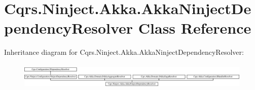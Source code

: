 \hypertarget{classCqrs_1_1Ninject_1_1Akka_1_1AkkaNinjectDependencyResolver}{}\section{Cqrs.\+Ninject.\+Akka.\+Akka\+Ninject\+Dependency\+Resolver Class Reference}
\label{classCqrs_1_1Ninject_1_1Akka_1_1AkkaNinjectDependencyResolver}
Inheritance diagram for Cqrs.\+Ninject.\+Akka.\+Akka\+Ninject\+Dependency\+Resolver\+:\begin{figure}[H]
\begin{center}
\leavevmode
\includegraphics[height=1.257485cm]{classCqrs_1_1Ninject_1_1Akka_1_1AkkaNinjectDependencyResolver}
\end{center}
\end{figure}
